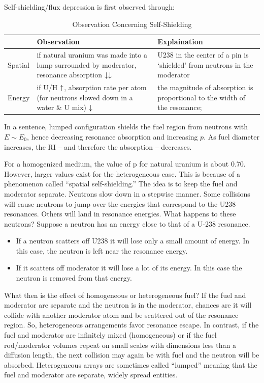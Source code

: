 \documentclass{school-22.211-notes}
\begin{document}
\clearpage
Self-shielding/flux depression is first observed through: 
\begin{table}[ht]
  \centering
  \begin{tabular}{|l|p{6cm}|p{6cm}|} \hline
    & Observation & Explaination \\ \hline
    Spatial 
    & if natural uranium was made into a lump surrounded by moderator, resonance absorption $\downarrow \downarrow$  
    & U238 in the center of a pin is `shielded' from neutrons in the moderator \\ \hline
    Energy
    & if U/H $\uparrow$, absorption rate per atom (for neutrons slowed down in a water \& U mix) $\downarrow$   
    & the magnitude of absorption is proportional to the width of the resonance;  \\ \hline
  \end{tabular}
  \caption{Observation Concerning Self-Shielding}
  \end{table}

In a sentence, lumped configuration shields the fuel region from neutrons with $E \sim E_0$, hence decreasing resonance absorption and increasing $p$. As fuel diameter increases, the RI -- and therefore the absorption -- decreases. 

For a homogenized medium, the value of p for natural uranium is about 0.70.
However, larger values exist for the heterogeneous case. This is because of a
phenomenon called ``spatial self-shielding.'' The idea is to keep the fuel and
moderator separate. Neutrons slow down in a stepwise manner. Some collisions
will cause neutrons to jump over the energies that correspond to the U238
resonances. Others will land in resonance energies. What happens to these neutrons? 
Suppose a neutron has an energy close to that of a U-238 resonance. 
\begin{itemize}
\item If a neutron scatters off U238 it will lose
only a small amount of energy. In this case, the neutron is
left near the resonance energy.
\item If it scatters off moderator it will lose a lot of its energy.  In this case the neutron is removed from that energy.
\end{itemize}

What then is the effect of homogeneous or heterogeneous fuel? If the fuel and
moderator are separate and the neutron is in the moderator, chances are it will
collide with another moderator atom and be scattered out of the resonance region.
So, heterogeneous arrangements favor resonance escape. In contrast, if the fuel
and moderator are infinitely mixed (homogeneous) or if the fuel rod/moderator
volumes repeat on small scales with dimensions less than a diffusion length, the
next collision may again be with fuel and the neutron will be absorbed.
Heterogeneous arrays are sometimes called ``lumped'' meaning that the fuel and
moderator are separate, widely spread entities.
\end{document}

